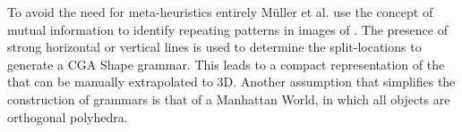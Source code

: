 








To avoid the need for meta-heuristics entirely M\"{u}ller et al.\cite{Mueller:2007:IBP} use the concept of mutual information to identify repeating patterns in images of \facades{}. The presence of strong horizontal or vertical lines is used to determine the split-locations to generate a CGA Shape grammar. This leads to a compact representation of the \facade{} that can be manually extrapolated to 3D. Another assumption that simplifies the construction of grammars is that of a Manhattan World\cite{Vanegas10}, in which all objects are orthogonal polyhedra.

